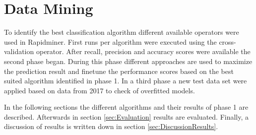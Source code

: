 \section{Data Mining}

To identify the best classification algorithm different available operators were used in Rapidminer.
First runs per algorithm were executed using the cross-validation operator. After recall, precision and accuracy scores were available the second phase began. During this phase different approaches are used to maximize the prediction result and finetune the performance scores based on the best suited algorithm identified in phase 1. In a third phase a new test data set were applied based on data from 2017 to check of overfitted models. \newline

In the following sections the different algorithms and their results of phase 1 are described. 
Afterwards in section \ref{sec:Evaluation} results are evaluated.
Finally, a discussion of results is written down in section \ref{sec:DiscussionResults}. 











